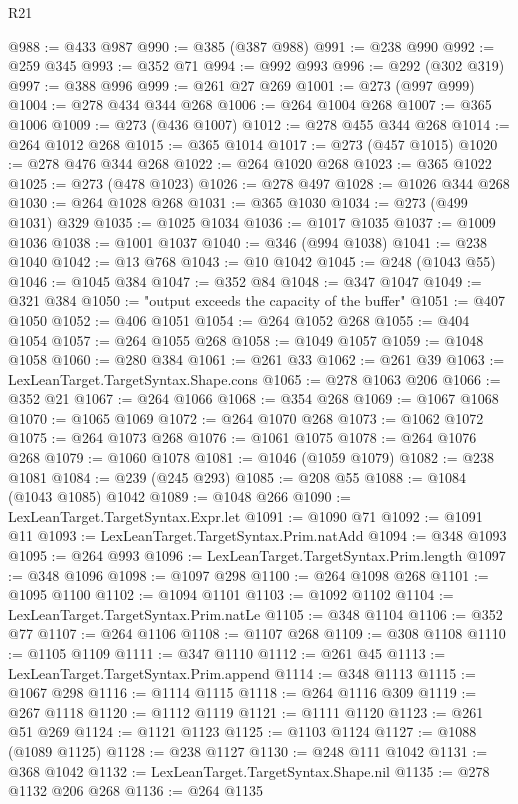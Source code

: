 \begin{lexlean}{R21}
\begin{coremodule}
{{{{{{{{{{{{{{{{{{{@988 := @433 @987
@990 := @385 (@387 @988)
@991 := @238 @990
@992 := @259 @345
@993 := @352 @71
@994 := @992 @993
@996 := @292 (@302 @319)
@997 := @388 @996
@999 := @261 @27 @269
@1001 := @273 (@997 @999)
@1004 := @278 @434 @344 @268
@1006 := @264 @1004 @268
@1007 := @365 @1006
@1009 := @273 (@436 @1007)
@1012 := @278 @455 @344 @268
@1014 := @264 @1012 @268
@1015 := @365 @1014
@1017 := @273 (@457 @1015)
@1020 := @278 @476 @344 @268
@1022 := @264 @1020 @268
@1023 := @365 @1022
@1025 := @273 (@478 @1023)
@1026 := @278 @497
@1028 := @1026 @344 @268
@1030 := @264 @1028 @268
@1031 := @365 @1030
@1034 := @273 (@499 @1031) @329
@1035 := @1025 @1034
@1036 := @1017 @1035
@1037 := @1009 @1036
@1038 := @1001 @1037
@1040 := @346 (@994 @1038)
@1041 := @238 @1040
@1042 := @13 @768
@1043 := @10 @1042
@1045 := @248 (@1043 @55)
@1046 := @1045 @384
@1047 := @352 @84
@1048 := @347 @1047
@1049 := @321 @384
@1050 := "output exceeds the capacity of the buffer"
@1051 := @407 @1050
@1052 := @406 @1051
@1054 := @264 @1052 @268
@1055 := @404 @1054
@1057 := @264 @1055 @268
@1058 := @1049 @1057
@1059 := @1048 @1058
@1060 := @280 @384
@1061 := @261 @33
@1062 := @261 @39
@1063 := LexLeanTarget.TargetSyntax.Shape.cons
@1065 := @278 @1063 @206
@1066 := @352 @21
@1067 := @264 @1066
@1068 := @354 @268
@1069 := @1067 @1068
@1070 := @1065 @1069
@1072 := @264 @1070 @268
@1073 := @1062 @1072
@1075 := @264 @1073 @268
@1076 := @1061 @1075
@1078 := @264 @1076 @268
@1079 := @1060 @1078
@1081 := @1046 (@1059 @1079)
@1082 := @238 @1081
@1084 := @239 (@245 @293)
@1085 := @208 @55
@1088 := @1084 (@1043 @1085) @1042
@1089 := @1048 @266
@1090 := LexLeanTarget.TargetSyntax.Expr.let
@1091 := @1090 @71
@1092 := @1091 @11
@1093 := LexLeanTarget.TargetSyntax.Prim.natAdd
@1094 := @348 @1093
@1095 := @264 @993
@1096 := LexLeanTarget.TargetSyntax.Prim.length
@1097 := @348 @1096
@1098 := @1097 @298
@1100 := @264 @1098 @268
@1101 := @1095 @1100
@1102 := @1094 @1101
@1103 := @1092 @1102
@1104 := LexLeanTarget.TargetSyntax.Prim.natLe
@1105 := @348 @1104
@1106 := @352 @77
@1107 := @264 @1106
@1108 := @1107 @268
@1109 := @308 @1108
@1110 := @1105 @1109
@1111 := @347 @1110
@1112 := @261 @45
@1113 := LexLeanTarget.TargetSyntax.Prim.append
@1114 := @348 @1113
@1115 := @1067 @298
@1116 := @1114 @1115
@1118 := @264 @1116 @309
@1119 := @267 @1118
@1120 := @1112 @1119
@1121 := @1111 @1120
@1123 := @261 @51 @269
@1124 := @1121 @1123
@1125 := @1103 @1124
@1127 := @1088 (@1089 @1125)
@1128 := @238 @1127
@1130 := @248 @111 @1042
@1131 := @368 @1042
@1132 := LexLeanTarget.TargetSyntax.Shape.nil
@1135 := @278 @1132 @206 @268
@1136 := @264 @1135
}}}}}}}}}}}}}}}}}}}
\end{coremodule}
\end{lexlean}
